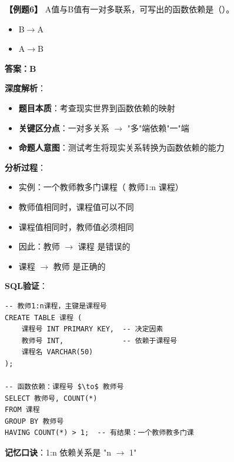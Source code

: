 \documentclass[12pt, a4paper]{article}
\newenvironment{bluebox}[1]{%
  \begin{trivlist}
  \item[\hskip\labelsep \textbf{#1}]
  \setlength{\parskip}{0.5ex}
  \setlength{\itemsep}{0.5ex}
}{%
  \end{trivlist}
  }
\begin{document}
\begin{bluebox}{例题6：函数依赖判定}
	\textbf{【例题6】} A值与B值有一对多联系，可写出的函数依赖是（\quad）。

	\begin{itemize}
		\item[A)] B$\to$A
		\item[B)] A$\to$B
	\end{itemize}

	\textbf{答案：B}

	\textbf{深度解析}：

	\begin{itemize}[leftmargin=*, nosep]
		\item \textbf{题目本质}：考查现实世界到函数依赖的映射
		\item \textbf{关键区分点}：一对多关系 $\to$ "多"端依赖"一"端
		\item \textbf{命题人意图}：测试考生将现实关系转换为函数依赖的能力
	\end{itemize}

	\textbf{分析过程}：
	\begin{itemize}
		\item 实例：一个教师教多门课程（ 教师1:n 课程）
		\item 教师值相同时，课程值可以不同
		\item 课程值相同时，教师值必须相同
		\item 因此：教师 $\to$ 课程 是错误的
		\item 课程 $\to$ 教师 是正确的
	\end{itemize}

	\textbf{SQL验证}：
	\begin{verbatim}
-- 教师1:n课程，主键是课程号
CREATE TABLE 课程 (
    课程号 INT PRIMARY KEY,  -- 决定因素
    教师号 INT,              -- 依赖于课程号
    课程名 VARCHAR(50)
);

-- 函数依赖：课程号 $\to$ 教师号
SELECT 教师号, COUNT(*)
FROM 课程
GROUP BY 教师号
HAVING COUNT(*) > 1;  -- 有结果：一个教师教多门课
	\end{verbatim}

	\textbf{记忆口诀}：1:n 依赖关系是 "n $\to$ 1"
\end{bluebox}
\end{document}
